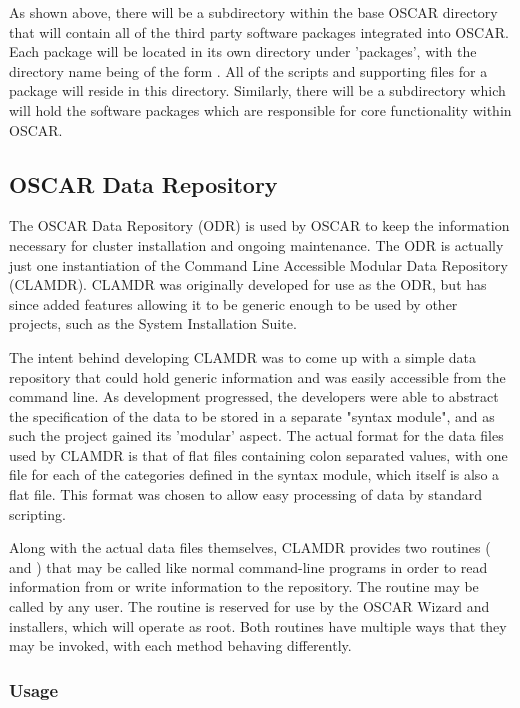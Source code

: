 As shown above, there will be a  subdirectory within
the base OSCAR directory that will contain all of the third party
software packages integrated into OSCAR. Each package will be located
in its own directory under 'packages', with the directory name being
of the form . All of the scripts and supporting files
for a package will reside in this directory.  Similarly, there will be
a  subdirectory which will hold the software
packages which are responsible for core functionality within OSCAR.

\subsection{OSCAR Data Repository}

The OSCAR Data Repository (ODR) is used by OSCAR to keep the
information necessary for cluster installation and ongoing
maintenance. The ODR is actually just one instantiation of the Command
Line Accessible Modular Data Repository (CLAMDR). CLAMDR was
originally developed for use as the ODR, but has since added features
allowing it to be generic enough to be used by other projects, such as
the System Installation Suite.

The intent behind developing CLAMDR was to come up with a simple data
repository that could hold generic information and was easily
accessible from the command line. As development progressed, the
developers were able to abstract the specification of the data to be
stored in a separate "syntax module", and as such the project gained
its 'modular' aspect. The actual format for the data files used by
CLAMDR is that of flat files containing colon separated values, with
one file for each of the categories defined in the syntax module,
which itself is also a flat file.  This format was chosen to allow
easy processing of data by standard scripting.

Along with the actual data files themselves, CLAMDR provides two
routines ( and ) that may be called
like normal command-line programs in order to read information from or
write information to the repository. The  routine may
be called by any user. The  routine is reserved for
use by the OSCAR Wizard and installers, which will operate as root.
Both routines have multiple ways that they may be invoked, with each
method behaving differently.

\subsubsection{ Usage}

